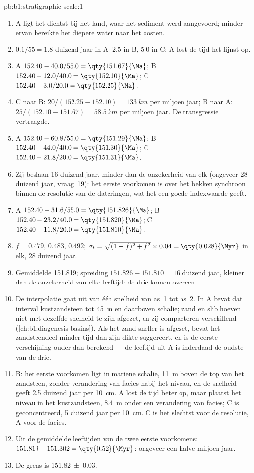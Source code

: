 \begin{solution}{pb:b1:stratigraphic-scale:1}
\begin{enumerate}
  \item A ligt het dichtst bij het land, waar het sediment werd aangevoerd; minder ervan bereikte het diepere water naar het oosten.
  \item $0.1/55 = \num{1.8}$ duizend jaar in A, $\num{2.5}$ in B, $\num{5.0}$ in C: A lost de tijd het fijnst op.
  \item A $152.40 - 40.0/55.0 = \qty{151.67}{\Ma}$; B $152.40 - 12.0/40.0 =
        \qty{152.10}{\Ma}$; C $152.40 - 3.0/20.0 = \qty{152.25}{\Ma}$.
  \item C naar B: $20/(152.25 - 152.10) = \qty{133}{km}$ per miljoen jaar; B naar A:
        $25/(152.10 - 151.67) = \qty{58.5}{km}$ per miljoen jaar. De transgressie vertraagde.
  \item A $152.40 - 60.8/55.0 = \qty{151.29}{\Ma}$; B $152.40 - 44.0/40.0 =
        \qty{151.30}{\Ma}$; C $152.40 - 21.8/20.0 = \qty{151.31}{\Ma}$.
  \item Zij beslaan \num{16} duizend jaar, minder dan de onzekerheid van elk (ongeveer \num{28} duizend jaar, vraag~19): het eerste voorkomen is over het bekken synchroon binnen de resolutie van de dateringen, wat het een goede indexwaarde geeft.
  \item A $152.40 - 31.6/55.0 = \qty{151.826}{\Ma}$; B $152.40 - 23.2/40.0 =
        \qty{151.820}{\Ma}$; C $152.40 - 11.8/20.0 = \qty{151.810}{\Ma}$.
  \item $f = 0.479$, $0.483$, $0.492$; $\sigma_t = \sqrt{(1 - f)^2 + f^2} \times
        0.04 = \qty{0.028}{\Myr}$ in elk, \num{28} duizend jaar.
  \item Gemiddelde \qty{151.819}{\Ma}; spreiding $151.826 - 151.810 = \num{16}$ duizend
        jaar, kleiner dan de onzekerheid van elke leeftijd: de drie komen overeen.
  \item De interpolatie gaat uit van één snelheid van as~1 tot as~2. In A bevat dat interval kustzandsteen tot \qty{45}{m} en daarboven schalie; zand en slib hoeven niet met dezelfde snelheid te zijn afgezet, en zij compacteren verschillend (\cref{ch:b1:diagenesis-basins}). Als het zand sneller is afgezet, bevat het zandsteendeel minder tijd dan zijn dikte suggereert, en is de eerste verschijning ouder dan berekend --- de leeftijd uit A is inderdaad de oudste van de drie.
  \item B: het eerste voorkomen ligt in mariene schalie, \qty{11}{m} boven de top van het zandsteen, zonder verandering van facies nabij het niveau, en de snelheid geeft \num{2.5} duizend jaar per \qty{10}{cm}. A lost de tijd beter op, maar plaatst het niveau in het kustzandsteen, \qty{8.4}{m} onder een verandering van facies; C is geconcentreerd, \num{5} duizend jaar per \qty{10}{cm}. C is het slechtst voor de resolutie, A voor de facies.
  \item Uit de gemiddelde leeftijden van de twee eerste voorkomens: $151.819 - 151.302 =
        \qty{0.52}{\Myr}$: ongeveer een halve miljoen jaar.
  \item De grens is \qty[uncertainty-mode=separate]{151.82(3)}{\Ma}.
\end{enumerate}
\end{solution}
